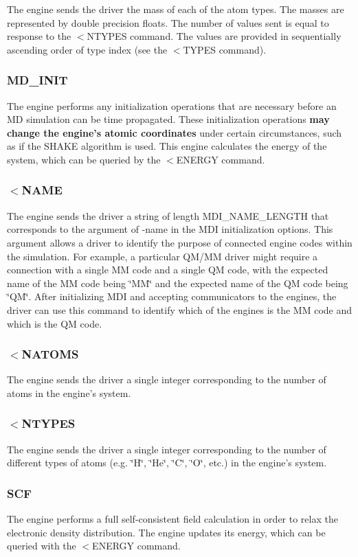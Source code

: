The engine sends the driver the mass of each of the atom types. The masses are represented by double precision floats. The number of values sent is equal to response to the $<$N\-T\-Y\-P\-E\-S command. The values are provided in sequentially ascending order of type index (see the {\ttfamily $<$T\-Y\-P\-E\-S} command).\hypertarget{index_md_init}{}\subsubsection{M\-D\-\_\-\-I\-N\-I\-T}\label{index_md_init}
The engine performs any initialization operations that are necessary before an M\-D simulation can be time propagated. These initialization operations {\bfseries  may change the engine's atomic coordinates } under certain circumstances, such as if the S\-H\-A\-K\-E algorithm is used. This engine calculates the energy of the system, which can be queried by the {\ttfamily $<$E\-N\-E\-R\-G\-Y} command.\hypertarget{index_send_name}{}\subsubsection{$<$\-N\-A\-M\-E}\label{index_send_name}
The engine sends the driver a string of length {\ttfamily M\-D\-I\-\_\-\-N\-A\-M\-E\-\_\-\-L\-E\-N\-G\-T\-H} that corresponds to the argument of {\ttfamily -\/name} in the M\-D\-I initialization options. This argument allows a driver to identify the purpose of connected engine codes within the simulation. For example, a particular Q\-M/\-M\-M driver might require a connection with a single M\-M code and a single Q\-M code, with the expected name of the M\-M code being \char`\"{}\-M\-M\char`\"{} and the expected name of the Q\-M code being \char`\"{}\-Q\-M\char`\"{}. After initializing M\-D\-I and accepting communicators to the engines, the driver can use this command to identify which of the engines is the M\-M code and which is the Q\-M code.\hypertarget{index_recv_natoms}{}\subsubsection{$<$\-N\-A\-T\-O\-M\-S}\label{index_recv_natoms}
The engine sends the driver a single integer corresponding to the number of atoms in the engine's system.\hypertarget{index_recv_types}{}\subsubsection{$<$\-N\-T\-Y\-P\-E\-S}\label{index_recv_types}
The engine sends the driver a single integer corresponding to the number of different types of atoms (e.\-g. \char`\"{}\-H\char`\"{}, \char`\"{}\-He\char`\"{}, \char`\"{}\-C\char`\"{}, \char`\"{}\-O\char`\"{}, etc.) in the engine's system.\hypertarget{index_scf_command}{}\subsubsection{S\-C\-F}\label{index_scf_command}
The engine performs a full self-\/consistent field calculation in order to relax the electronic density distribution. The engine updates its energy, which can be queried with the {\ttfamily $<$E\-N\-E\-R\-G\-Y} command. 